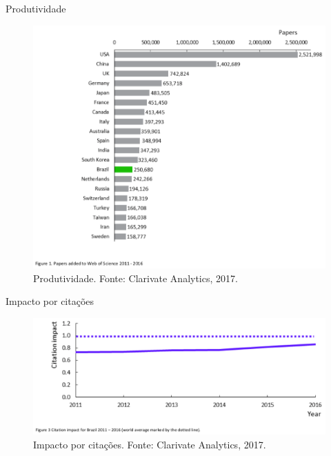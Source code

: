 \begin{frame}{Produtividade}
\begin{figure}
\centering
\includegraphics[scale=0.25]{figs/01/panorama-produtividade}
\caption{Produtividade. Fonte: Clarivate Analytics, 2017.}
\end{figure}
\end{frame}

\begin{frame}{Impacto por citações}
\begin{figure}
\centering
\includegraphics[scale=0.3]{figs/01/panorama-impacto-citacao}
\caption{Impacto por citações. Fonte: Clarivate Analytics, 2017.}
\end{figure}
\end{frame}

